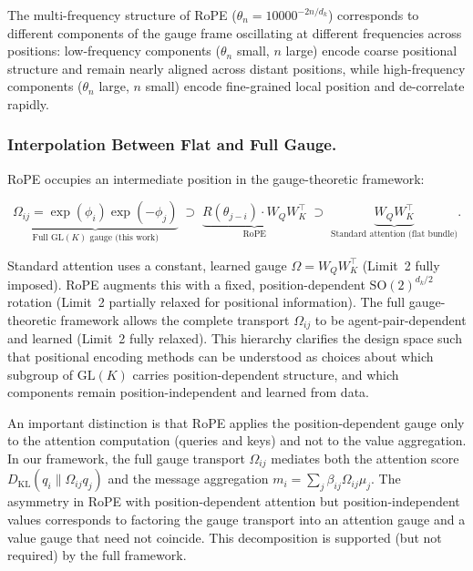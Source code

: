 \documentclass[twoside,11pt]{article}
\begin{document}
The multi-frequency structure of RoPE ($\theta_n = 10000^{-2n/d_k}$) corresponds to different components of the gauge frame oscillating at different frequencies across positions: low-frequency components ($\theta_n$ small, $n$ large) encode coarse positional structure and remain nearly aligned across distant positions, while high-frequency components ($\theta_n$ large, $n$ small) encode fine-grained local position and de-correlate rapidly. 

\subsubsection{Interpolation Between Flat and Full Gauge.}

RoPE occupies an intermediate position in the gauge-theoretic framework:

\begin{equation}
\underbrace{\Omega_{ij} = \exp(\phi_i)\exp(-\phi_j)}_{\text{Full GL}(K)\text{ gauge (this work)}} \;\supset\;
\underbrace{R(\theta_{j-i}) \cdot W_Q W_K^\top}_{\text{RoPE}} \;\supset\;
\underbrace{W_Q W_K^\top}_{\text{Standard attention (flat bundle)}}.
\end{equation}

Standard attention uses a constant, learned gauge $\Omega = W_Q W_K^\top$ (Limit~2 fully imposed). RoPE augments this with a fixed, position-dependent $\mathrm{SO}(2)^{d_k/2}$ rotation (Limit~2 partially relaxed for positional information). The full gauge-theoretic framework allows the complete transport $\Omega_{ij}$ to be agent-pair-dependent and learned (Limit~2 fully relaxed). This hierarchy clarifies the design space such that positional encoding methods can be understood as choices about which subgroup of $\mathrm{GL}(K)$ carries position-dependent structure, and which components remain position-independent and learned from data.

An important distinction is that RoPE applies the position-dependent gauge only to the attention computation (queries and keys) and not to the value aggregation. In our framework, the full gauge transport $\Omega_{ij}$ mediates both the attention score $D_{\mathrm{KL}}(q_i \| \Omega_{ij} q_j)$ and the message aggregation $m_i = \sum_j \beta_{ij} \Omega_{ij}\mu_j$. The asymmetry in RoPE with position-dependent attention but position-independent values corresponds to factoring the gauge transport into an attention gauge and a value gauge that need not coincide. This decomposition is supported (but not required) by the full framework.
\end{document}
